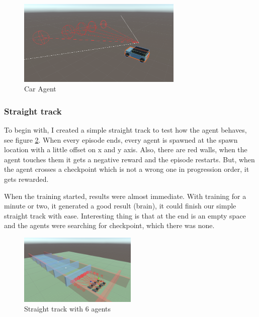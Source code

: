 \documentclass[a4paper,12pt,openright]{book}
\begin{document}
\begin{figure}[h]
\begin{center}
\includegraphics[width=0.7\textwidth]{Images/CarAgent.png}
\end{center}
\caption{Car Agent}
\label{CarAgent}
\end{figure}

\subsubsection{Straight track}

To begin with, I created a simple straight track to test how the agent behaves, see figure \ref{StraighTrack}. When every episode ends, every agent is spawned at the spawn location with a little offset on x and y axis. Also, there are red walls, when the agent touches them it gets a negative reward and the episode restarts. But, when the agent crosses a checkpoint which is not a wrong one in progression order, it gets rewarded.

When the training started, results were almost immediate. With training for a minute or two, it generated a good result (brain), it could finish our simple straight track with ease. Interesting thing is that at the end is an empty space and the agents were searching for checkpoint, which there was none.

\begin{figure}[h]
\begin{center}
\includegraphics[width=0.5\textwidth]{Images/StraightTrack.png}
\end{center}
\caption{Straight track with 6 agents}
\label{StraighTrack}
\end{figure}
\end{document}
